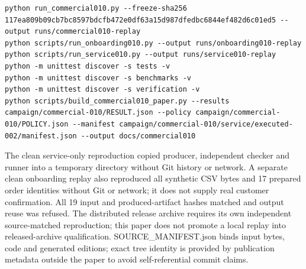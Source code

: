\documentclass[10pt,letterpaper]{article}
\begin{document}
\begin{Verbatim}[fontsize=\scriptsize,breaklines=true]
python run_commercial010.py --freeze-sha256 117ea809b09cb7bc8597bdcfb472e0df63a15d987dfedbc6844ef482d6c01ed5 --output runs/commercial010-replay
python scripts/run_onboarding010.py --output runs/onboarding010-replay
python scripts/run_service010.py --output runs/service010-replay
python -m unittest discover -s tests -v
python -m unittest discover -s benchmarks -v
python -m unittest discover -s verification -v
python scripts/build_commercial010_paper.py --results campaign/commercial-010/RESULT.json --policy campaign/commercial-010/POLICY.json --manifest campaign/commercial-010/service/executed-002/manifest.json --output docs/commercial010
\end{Verbatim}
The clean service-only reproduction copied producer, independent checker and runner into a temporary directory without Git history or network. A separate clean onboarding replay also reproduced all synthetic CSV bytes and 17 prepared order identities without Git or network; it does not supply real customer confirmation. All 19 input and produced-artifact hashes matched and output reuse was refused. The distributed release archive requires its own independent source-matched reproduction; this paper does not promote a local replay into released-archive qualification. SOURCE\_\allowbreak{}MANIFEST.json binds input bytes, code and generated editions; exact tree identity is provided by publication metadata outside the paper to avoid self-referential commit claims.
\end{document}
